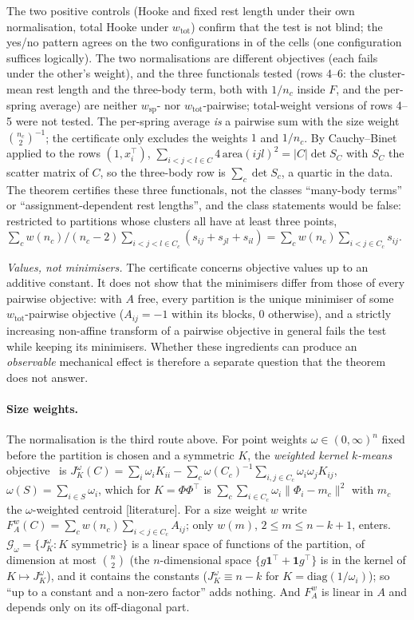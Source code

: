 \documentclass[11pt,a4paper]{article}
\theoremstyle{plain}
\theoremstyle{definition}
\theoremstyle{remark}
\newcommand{\spec}{\mathrm{sp}}
\newcommand{\tot}{\mathrm{tot}}
\newcommand{\one}{\mathbf 1}
\newcommand{\status}[1]{\textsf{\small [#1]}}
\begin{document}
\noindent The two positive controls (Hooke and fixed rest length under their own normalisation, total Hooke under $w_\tot$) confirm that the test is not blind; the yes/no pattern agrees on the two configurations in \EfourCellsSame{} of the \EfourCells{} cells (one configuration suffices logically). The two normalisations are different objectives (each fails under the other's weight), and the three functionals tested (rows 4--6: the cluster-mean rest length and the three-body term, both with $1/n_c$ inside $F$, and the per-spring average) are neither $w_\spec$- nor $w_\tot$-pairwise; total-weight versions of rows 4--5 were not tested. The per-spring average \emph{is} a pairwise sum with the size weight $\binom{n_c}{2}^{-1}$; the certificate only excludes the weights $1$ and $1/n_c$. By Cauchy--Binet applied to the rows $(1,x_i^{\!\top})$, $\sum_{i<j<l\in C}4\,\mathrm{area}(ijl)^2=|C|\det S_C$ with $S_C$ the scatter matrix of $C$, so the three-body row is $\sum_c\det S_c$, a quartic in the data. The theorem certifies these three functionals, not the classes ``many-body terms'' or ``assignment-dependent rest lengths'', and the class statements would be false: restricted to partitions whose clusters all have at least three points, $\sum_cw(n_c)/(n_c-2)\sum_{i<j<l\in C_c}(s_{ij}+s_{jl}+s_{il})=\sum_cw(n_c)\sum_{i<j\in C_c}s_{ij}$.

\emph{Values, not minimisers.} The certificate concerns objective values up to an additive constant. It does not show that the minimisers differ from those of every pairwise objective: with $A$ free, every partition is the unique minimiser of some $w_\tot$-pairwise objective ($A_{ij}=-1$ within its blocks, $0$ otherwise), and a strictly increasing non-affine transform of a pairwise objective in general fails the test while keeping its minimisers. Whether these ingredients can produce an \emph{observable} mechanical effect is therefore a separate question that the theorem does not answer.

\paragraph{Size weights.} The normalisation is the third route above. For point weights $\omega\in(0,\infty)^n$ fixed before the partition is chosen and a symmetric $K$, the \emph{weighted kernel $k$-means} objective~\citep{dhillon2004,dhillon2007} is $J^\omega_K(C)=\sum_i\omega_iK_{ii}-\sum_c\omega(C_c)^{-1}\sum_{i,j\in C_c}\omega_i\omega_jK_{ij}$, $\omega(S)=\sum_{i\in S}\omega_i$, which for $K=\Phi\Phi^{\!\top}$ is $\sum_c\sum_{i\in C_c}\omega_i\lVert\Phi_i-m_c\rVert^2$ with $m_c$ the $\omega$-weighted centroid \status{literature}. For a size weight $w$ write $F^w_A(C)=\sum_cw(n_c)\sum_{i<j\in C_c}A_{ij}$; only $w(m)$, $2\le m\le n-k+1$, enters. $\mathcal G_\omega=\{J^\omega_K:K\text{ symmetric}\}$ is a linear space of functions of the partition, of dimension at most $\binom n2$ (the $n$-dimensional space $\{g\one^{\!\top}+\one g^{\!\top}\}$ is in the kernel of $K\mapsto J^\omega_K$), and it contains the constants ($J^\omega_K\equiv n-k$ for $K=\mathrm{diag}(1/\omega_i)$); so ``up to a constant and a non-zero factor'' adds nothing. And $F^w_A$ is linear in $A$ and depends only on its off-diagonal part.
\end{document}
